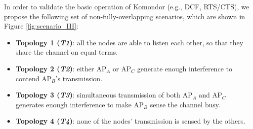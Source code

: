 \documentclass[a4paper]{article}
\begin{document}
%
	In order to validate the basic operation of Komondor (e.g., DCF, RTS/CTS), we propose the following set of non-fully-overlapping scenarios, which are shown in Figure \ref{fig:scenario_III}:
	\begin{itemize}
		\item \textbf{Topology 1 (\emph{T1})}: all the nodes are able to listen each other, so that they share the channel on equal terms.
		\item \textbf{Topology 2 (\emph{T2})}: either $\text{AP}_A$ or $\text{AP}_C$ generate enough interference to contend $\text{AP}_B$'s transmission.
		\item \textbf{Topology 3 (\emph{T3})}: simultaneous transmission of both $\text{AP}_A$ and $\text{AP}_C$ generates enough interference to make $\text{AP}_B$ sense the channel busy.
		\item \textbf{Topology 4 (\emph{T4})}: none of the nodes' transmission is sensed by the others.
	\end{itemize}
	
\end{document}
